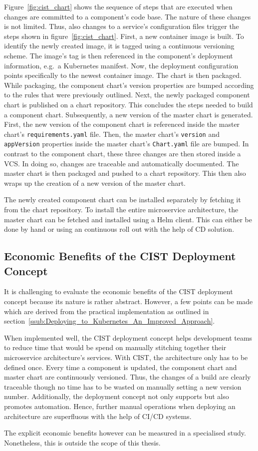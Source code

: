 Figure~\ref{fig:cist_chart} shows the sequence of steps that are executed when
changes are committed to a component's code base. The nature of these changes
is not limited. Thus, also changes to a service's configuration files trigger
the steps shown in figure~\ref{fig:cist_chart}. First, a new container image is
built. To identify the newly created image, it is tagged using a continuous
versioning scheme. The image's tag is then referenced in the component's
deployment information, e.g.\ a Kubernetes manifest. Now, the deployment
configuration points specifically to the newest container image. The chart is
then packaged. While packaging, the component chart's version properties are
bumped according to the rules that were previously outlined. Next, the newly
packaged component chart is published on a chart repository. This concludes the
steps needed to build a component chart. Subsequently, a new version of the
master chart is generated. First, the new version of the component chart is
referenced inside the master chart's \texttt{requirements.yaml} file. Then, the
master chart's \texttt{version} and \texttt{appVersion} properties inside the
master chart's \texttt{Chart.yaml} file are bumped. In contrast to the
component chart, these three changes are then stored inside a \ac{VCS}. In
doing so, changes are traceable and automatically documented. The master chart
is then packaged and pushed to a chart repository. This then also wraps up the
creation of a new version of the master chart.

The newly created component chart can be installed separately by fetching it
from the chart repository. To install the entire microservice architecture, the
master chart can be fetched and installed using a Helm client. This can either
be done by hand or using an continuous roll out with the help of \ac{CD}
solution.

\subsection{Economic Benefits of the \acf{CIST} Deployment Concept}%
\label{sub:Economic_Benefits_of_the_CIST_Deployment_Concept}

It is challenging to evaluate the economic benefits of the \ac{CIST} deployment
concept because its nature is rather abstract. However, a few points can be
made which are derived from the practical implementation as outlined in
section~\ref{ssub:Deploying_to_Kubernetes_An_Improved_Approach}.

When implemented well, the \ac{CIST} deployment concept helps development teams
to reduce time that would be spend on manually stitching together their
microservice architecture's services. With \ac{CIST}, the architecture only has
to be defined once. Every time a component is updated, the component chart and
master chart are continuously versioned. Thus, the changes of a build are
clearly traceable though no time has to be wasted on manually setting a new
version number. Additionally, the deployment concept not only supports but also
promotes automation. Hence, further manual operations when deploying an
architecture are superfluous with the help of \ac{CI}/\ac{CD} systems.

The explicit economic benefits however can be measured in a specialised study.
Nonetheless, this is outside the scope of this thesis.
